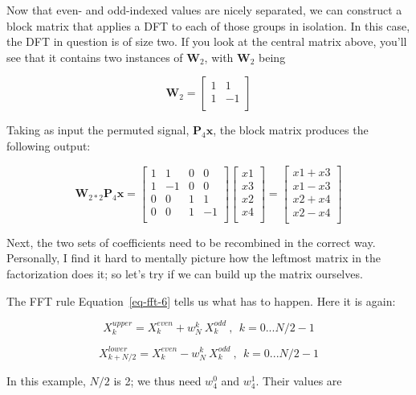 \documentclass[
  letterpaper,
]{krantz}
\begin{document}
Now that even- and odd-indexed values are nicely separated, we can
construct a block matrix that applies a DFT to each of those groups in
isolation. In this case, the DFT in question is of size two. If you look
at the central matrix above, you'll see that it contains two instances
of \(\mathbf{W}_2\), with \(\mathbf{W}_2\) being

\[
\mathbf{W}_2 =
\begin{bmatrix}
1 &   1  \\
1 &   -1 \\
\end{bmatrix}
\]

Taking as input the permuted signal, \(\mathbf{P}_4 \mathbf{x}\), the
block matrix produces the following output:

\[
\mathbf{W}_{2*2}\mathbf{P}_{4}\mathbf{x}
=
\begin{bmatrix}
1 &   1  & 0 &  0\\
1 &   -1  &  0 &  0\\
0 &   0  & 1 &  1\\
0 &   0  & 1 &  -1\\
\end{bmatrix}
\begin{bmatrix}
x1 \\
x3 \\
x2 \\
x4 \\
\end{bmatrix}
=
\begin{bmatrix}
x1+x3 \\
x1-x3 \\
x2+x4 \\
x2-x4 \\
\end{bmatrix}
\]

Next, the two sets of coefficients need to be recombined in the correct
way. Personally, I find it hard to mentally picture how the leftmost
matrix in the factorization does it; so let's try if we can build up the
matrix ourselves.

The FFT rule Equation~\ref{eq-fft-6} tells us what has to happen. Here
it is again:

\[
X^{upper}_k =  X^{even}_k +  w^k_N \ X^{odd}_k \ , \ \ k = 0 ... N/2-1
\]

\[
X^{lower}_{k+N/2} =  X^{even}_k -  w^k_N \ X^{odd}_k \ , \ \ k = 0 ... N/2-1
\]

In this example, \(N/2\) is 2; we thus need \(w^0_4\) and \(w^1_4\).
Their values are
\end{document}

